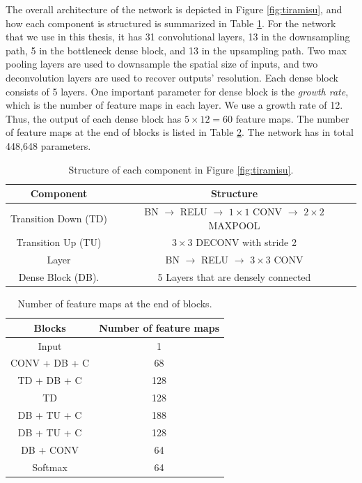 The overall architecture of the network is depicted in Figure \ref{fig:tiramisu}, and how each component is structured is summarized in Table \ref{table:components}. For the network that we use in this thesis, it has 31 convolutional layers, 13 in the downsampling path, 5 in the bottleneck dense block, and 13 in the upsampling path. Two max pooling layers are used to downsample the spatial size of inputs, and two deconvolution layers are used to recover outputs' resolution. Each dense block consists of 5 layers. One important parameter for dense block is the \textit{growth rate}, which is the number of feature maps in each layer. We use a growth rate of 12. Thus, the output of each dense block has $5 \times 12 = 60$ feature maps. The number of feature maps at the end of blocks is listed in Table \ref{table:number_feature_maps}. The network has in total 448,648 parameters.

\begin{table}[H]
\centering  
\begin{tabularx}{.9\textwidth}{c|c}
    \hline
    Component            & Structure            \\ \hline \hline
    Transition Down (TD) & BN $\rightarrow$ RELU $\rightarrow$ $1 \times 1$ CONV $\rightarrow$ $2 \times 2$ MAXPOOL \\ \hline
    Transition Up (TU)   & $3 \times 3$ DECONV with stride 2 \\
   \hline
   Layer                 & BN $\rightarrow$ RELU $\rightarrow$ $3 \times 3$ CONV \\ \hline
   Dense Block (DB).     & 5 Layers that are densely connected \\ \hline
  \end{tabularx}
\caption{Structure of each component in Figure \ref{fig:tiramisu}.}
\label{table:components}
\end{table}

\begin{table}[H]
\centering  
\begin{tabularx}{.53\textwidth}{c|c}
    \hline
    Blocks            & Number of feature maps            \\ \hline \hline
    Input                &    1 \\ \hline
    CONV + DB + C        &    68 \\ \hline
    TD + DB + C          &    128 \\ \hline
    TD                   &    128 \\ \hline
    DB + TU + C          &    188 \\ \hline
    DB + TU + C          &    128 \\ \hline
    DB + CONV            &    64 \\ \hline
    Softmax           &    64 \\ \hline
  \end{tabularx}
\caption{Number of feature maps at the end of blocks.}
\label{table:number_feature_maps}
\end{table}

